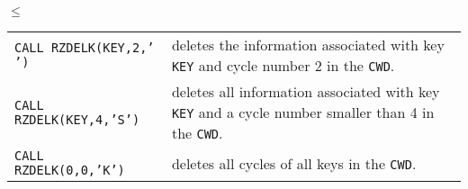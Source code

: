 \newpage

{\samepage \clearpage $\leq$
}


\newpage

{\samepage \clearpage \begin{tabular}[t]{>{\tt}l@{\qquad}p{}}
CALL RZDELK(KEY,2,' ')      & 
deletes the information associated with key {\tt KEY} 
and cycle number 2 in the {\tt CWD}.                      \\  [2mm]
CALL RZDELK(KEY,4,'S')      & 
deletes all information associated with key {\tt KEY}
and a cycle number smaller than 4 in the {\tt CWD}.       \\  [2mm]
CALL RZDELK(0,0,'K')        &
deletes all cycles of all keys in the {\tt CWD}.
\end{tabular}
}


\newpage

